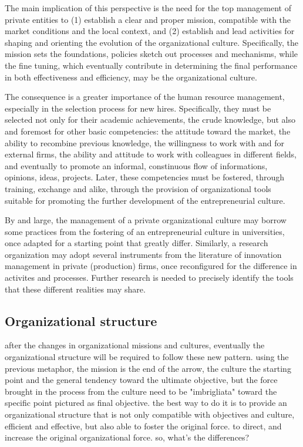 The main implication of this perspective is the need for the top management of private entities to (1) establish a clear and proper mission, compatible with the market conditions and the local context, and (2) establish and lead activities for shaping and orienting the evolution of the organizational culture. Specifically, the mission sets the foundations, policies sketch out processes and mechanisms, while the fine tuning, which eventually contribute in determining the final performance in both effectiveness and efficiency, may be the organizational culture.

The consequence is a greater importance of the human resource management, especially in the selection process for new hires. Specifically, they must be selected not only for their academic achievements, the crude knowledge, but also and foremost for other basic competencies: the attitude toward the market, the ability to recombine previous knowledge, the willingness to work with and for external firms, the ability and attitude to work with colleagues in different fields, and eventually to promote an informal, constinuous flow of informations, opinions, ideas, projects. Later, these competencies must be fostered, through training, exchange and alike, through the provision of organizational tools suitable for promoting the further development of the entrepreneurial culture. 

By and large, the management of a private organizational culture may borrow some practices from the fostering of an entrepreneurial culture in universities, once adapted for a starting point that greatly differ. Similarly, a research organization may adopt several instruments from the literature of innovation management in private (production) firms, once reconfigured for the difference in activites and processes. Further research is needed to precisely identify the tools that these different realities may share.

\subsection{Organizational structure}

after the changes in organizational missions and cultures, eventually the organizational structure will be required to follow these new pattern. using the previous metaphor, the mission is the end of the arrow, the culture the starting point and the general tendency toward the ultimate objective, but the force brought in the process from the culture need to be "imbrigliata" toward the specific point pictured as final objective. the best way to do it is to provide an organizational structure that is not only compatible with objectives and culture, efficient and effective, but also able to foster the original force. to direct, and increase the original organizational force. so, what's the differences?

